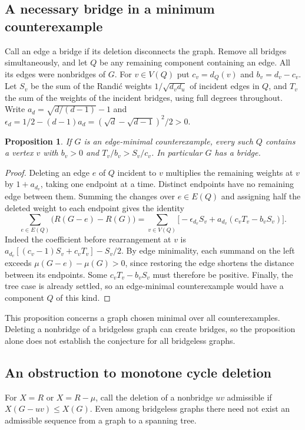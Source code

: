 \documentclass[11pt,a4paper]{article}
\newtheorem{proposition}[theorem]{Proposition}
\begin{document}
\subsection*{A necessary bridge in a minimum counterexample}
Call an edge a bridge if its deletion disconnects the graph. Remove all
bridges simultaneously, and let $Q$ be any remaining component containing
an edge. All its edges were nonbridges of $G$. For $v\in V(Q)$ put
$c_v=d_Q(v)$ and $b_v=d_v-c_v$. Let $S_v$ be the sum of the Randi\'c
weights $1/\sqrt{d_vd_u}$ of incident edges in $Q$, and $T_v$ the sum
of the weights of the incident bridges, using full degrees throughout.
Write $a_d=\sqrt{d/(d-1)}-1$ and
$\epsilon_d=1/2-(d-1)a_d=(\sqrt d-\sqrt{d-1})^2/2>0$.
\begin{proposition}\label{p07-prop:bridgemin}
If $G$ is an edge-minimal counterexample, every such $Q$ contains a
vertex $v$ with $b_v>0$ and $T_v/b_v>S_v/c_v$. In particular $G$
has a bridge.
\end{proposition}
\begin{proof}
Deleting an edge $e$ of $Q$ incident to $v$ multiplies the remaining
weights at $v$ by $1+a_{d_v}$, taking one endpoint at a time.
Distinct endpoints have no remaining edge between them. Summing the
changes over $e\in E(Q)$ and assigning half the deleted weight to each
endpoint gives the identity
\[
 \sum_{e\in E(Q)}\big(R(G-e)-R(G)\big)
 =\sum_{v\in V(Q)}\big[-\epsilon_{d_v}S_v+
        a_{d_v}(c_vT_v-b_vS_v)\big].
\]
Indeed the coefficient before rearrangement at $v$ is
$a_{d_v}[(c_v-1)S_v+c_vT_v]-S_v/2$. By edge minimality,
each summand on the left exceeds $\mu(G-e)-\mu(G)>0$, since restoring
the edge shortens the distance between its endpoints. Some $c_vT_v-b_vS_v$
must therefore be positive. Finally, the tree case is already settled,
so an edge-minimal counterexample would have a component $Q$ of this kind.
\end{proof}
This proposition concerns a graph chosen minimal over all counterexamples.
Deleting a nonbridge of a bridgeless graph can create bridges, so the
proposition alone does not establish the conjecture for all bridgeless graphs.
\subsection*{An obstruction to monotone cycle deletion}
For $X=R$ or $X=R-\mu$, call the deletion of a nonbridge $uv$
admissible if $X(G-uv)\le X(G)$. Even among bridgeless graphs there
need not exist an admissible sequence from a graph to a spanning tree.
\end{document}

